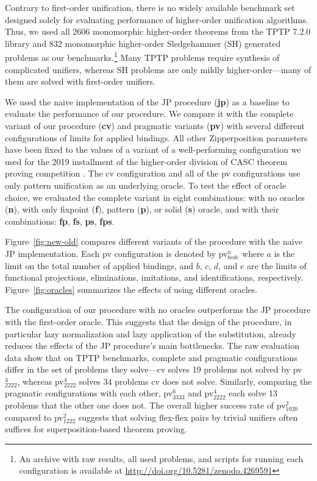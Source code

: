 Contrary to first-order unification, there is no widely available benchmark set 
designed solely for evaluating performance of higher-order
unification algorithms. Thus, we used all 2606 monomorphic higher-order theorems
from the TPTP 7.2.0 library \cite{gs-17-tptp} and 832 monomorphic higher-order
Sledgehammer (SH) generated problems \cite{ns-13-leo2sh} as our benchmarks.\footnote{An archive with raw
results, all used problems, and scripts for running each configuration is
available at \url{http://doi.org/10.5281/zenodo.4269591}}
Many TPTP problems require synthesis of complicated unifiers,
whereas SH problems are only mildly higher-order---many of them are
solved with first-order unifiers.

We used the naive implementation of the JP procedure (\textbf{jp}) as a baseline
to evaluate the performance of our procedure. We compare it with the complete
variant of our procedure (\textbf{cv}) and pragmatic variants (\textbf{pv}) with
several different configurations of limits for applied bindings. All other
Zipperposition parameters have been fixed to the values of a variant of a
well-performing configuration we used for the 2019 installment of the higher-order
division of CASC theorem proving competition \cite{gs-19-casc27}. The cv
configuration and all of the pv configurations use only pattern unification as
an underlying oracle. To test the effect of oracle choice, we evaluated the
complete variant in eight combinations: with no oracles (\textbf{n}), with only
fixpoint (\textbf{f}), pattern (\textbf{p}), or solid (\textbf{s}) oracle, and
with their combinations: \textbf{fp}, \textbf{fs}, \textbf{ps}, \textbf{fps}.

Figure~\ref{fig:new-old} compares different variants of the procedure with the
naive JP implementation. Each pv configuration is denoted by pv$^{a}_{bcde}$
where $a$ is the limit on the total number of applied bindings, and $b$, $c$,
$d$, and $e$ are the limits of functional projections, eliminations, imitations,
and identifications, respectively. Figure~\ref{fig:oracles} summarizes the
effects of using different oracles.

The configuration of our procedure with no oracles outperforms the JP procedure with the first-order oracle. This
suggests that the design of the procedure, in particular lazy normalization and
lazy application of the substitution, already reduces the effects of the JP
procedure's main bottlenecks. The raw evaluation data show that on TPTP benchmarks, complete and pragmatic configurations
differ in the set of problems they solve---cv solves 19
problems not solved by pv$^{4}_{2222}$, whereas pv$^{4}_{2222}$ solves 34
problems cv does not solve. Similarly, comparing the pragmatic configurations with each other,
pv$^{6}_{3333}$ and pv$^{4}_{2222}$ each solve 13 problems that the other one does not.  The overall higher success rate of pv$^2_{1020}$ compared to
pv$^2_{1222}$ suggests that solving flex-flex pairs by trivial unifiers often
suffices for superposition-based theorem proving. 

